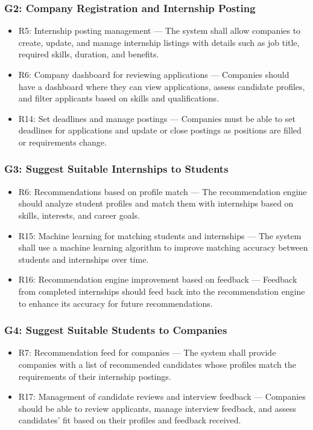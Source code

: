\subsubsection{G2: Company Registration and Internship Posting}
    \begin{itemize}
        \item R5: Internship posting management — The system shall allow companies to create, update, and manage internship listings with details such as job title, required skills, duration, and benefits.
        \item R6: Company dashboard for reviewing applications — Companies should have a dashboard where they can view applications, assess candidate profiles, and filter applicants based on skills and qualifications.
        \item R14: Set deadlines and manage postings — Companies must be able to set deadlines for applications and update or close postings as positions are filled or requirements change.
    \end{itemize}

\subsubsection{G3: Suggest Suitable Internships to Students}
    \begin{itemize}
        \item R6: Recommendations based on profile match — The recommendation engine should analyze student profiles and match them with internships based on skills, interests, and career goals.
        \item R15: Machine learning for matching students and internships — The system shall use a machine learning algorithm to improve matching accuracy between students and internships over time.
        \item R16: Recommendation engine improvement based on feedback — Feedback from completed internships should feed back into the recommendation engine to enhance its accuracy for future recommendations.
    \end{itemize}

\subsubsection{G4: Suggest Suitable Students to Companies}
    \begin{itemize}
        \item R7: Recommendation feed for companies — The system shall provide companies with a list of recommended candidates whose profiles match the requirements of their internship postings.
        \item R17: Management of candidate reviews and interview feedback — Companies should be able to review applicants, manage interview feedback, and assess candidates’ fit based on their profiles and feedback received.
    \end{itemize}


